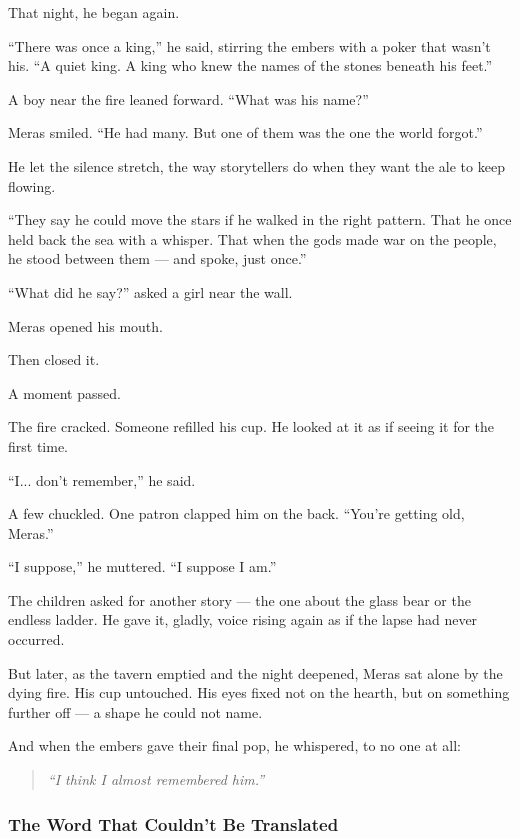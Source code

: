 \documentclass[12pt]{article}
\begin{document}
That night, he began again.

``There was once a king,'' he said, stirring the embers with a poker that wasn’t his. ``A quiet king. A king who knew the names of the stones beneath his feet.''

A boy near the fire leaned forward. ``What was his name?''

Meras smiled. ``He had many. But one of them was the one the world forgot.''

He let the silence stretch, the way storytellers do when they want the ale to keep flowing.

``They say he could move the stars if he walked in the right pattern. That he once held back the sea with a whisper. That when the gods made war on the people, he stood between them — and spoke, just once.''

``What did he say?'' asked a girl near the wall.

Meras opened his mouth.

Then closed it.

A moment passed.

The fire cracked. Someone refilled his cup. He looked at it as if seeing it for the first time.

``I... don’t remember,'' he said.

A few chuckled. One patron clapped him on the back. ``You’re getting old, Meras.''

``I suppose,'' he muttered. ``I suppose I am.''

The children asked for another story — the one about the glass bear or the endless ladder. He gave it, gladly, voice rising again as if the lapse had never occurred.

But later, as the tavern emptied and the night deepened, Meras sat alone by the dying fire. His cup untouched. His eyes fixed not on the hearth, but on something further off — a shape he could not name.

And when the embers gave their final pop, he whispered, to no one at all:

\begin{quote}
\emph{``I think I almost remembered him.''}
\end{quote}


\dotfill

\subsubsection{The Word That Couldn’t Be Translated}
\end{document}
